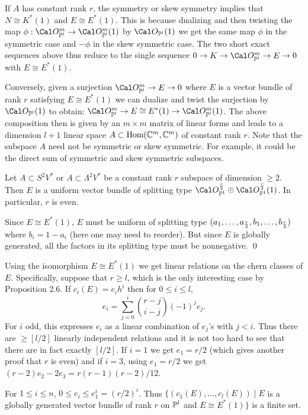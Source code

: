 If $A$ has constant rank $r$, the symmetry or skew symmetry
 implies that $N \cong K^*(1)$ and
$E \cong E^*(1)$. This is because dualizing and then twisting the
map $\phi: \co_{\pp{l}}^m \to \co_{\pp{l}}^m (1)$ by $\co_{\pp{l}}(1)$
we get the same map $\phi$ in the symmetric case and $-\phi$ in the skew
symmetric case. The two short exact sequences above thus reduce to the
single sequence $0 \to K \to \co_{\pp{l}}^m \to E \to 0$
with $E \cong E^*(1)$.

Conversely, given a surjection $\co_{\pp{l}}^m \to E \to 0$ where $E$ is
a vector bundle of rank $r$ satisfying $E \cong E^*(1)$ we can dualize and
twist the surjection by  $\co_{\pp{l}}(1)$ to obtain:
$\co_{\pp{l}}^m \to E \cong  E^*(1) \to \co_{\pp{l}}^m(1)$. The above 
composition then is given by an $m \times m$ matrix of linear forms  and leads
to a dimension $l+1$ linear space $A \subset \text{Hom}(\Bbb C^{m}, \Bbb C^{m})$ of
constant rank $r$. Note that the subspace $A$ need not be symmetric or
skew symmetric. For example, it could be the direct sum of symmetric and
skew symmetric subspaces.

 Let $A \subset S^2 V^*$ or $A \subset \Lambda^2V^*$ be a constant
rank $r$ subspace of dimension $\ge 2$. 
 Then $E$ is a uniform vector bundle of splitting type
$\co_{\pp 1}^{\frac r2}\oplus \Cal O^{\frac r2}_{\pp 1}(1)$. In particular,
$r$ is even.
\endproclaim

Since $E \cong E^*(1)$, $E$ must be uniform of splitting type
$(a_1, \hdots , a_{\frac r2},b_1, \hdots , b_{\frac r 2})$ where $b_i=1-a_i$ (here one
may need to reorder). But since $E$ is globally generated,
all the factors in its splitting type must be nonnegative.
\qed\enddemo

Using the isomorphism $E \cong E^*(1)$ we get linear relations on the
chern classes of $E$. Specifically, suppose that $r \ge l$, which is the
only interesting case by Proposition 2.6. If $c_i(E) = e_i h^i$ 
then for $0 \le i \le l$, 
$$e_i = \sum_{j=0}^{i} \binom{r-j}{i-j}(-1)^j e_j.$$
For $i$ odd, this 
expresses $e_i$ as a linear combination of $e_j$'s with $j < i$. Thus
there are $\ge [l/2]$ linearly independent relations and it is not
too hard to see that there are in fact exactly $[l/2]$. 
If $i = 1$ we get $e_1 = r/2$ (which gives another proof that
$r$ is even) and if $i=3$, using $e_1=r/2$ we get
$(r-2)e_2 - 2e_3 = r(r-1)(r-2)/12$.

 For $1 \le i \le n$, $0 \le e_i \le e_1^i = (r/2) ^i$.
Thus $\{ (c_1(E), \dots, c_l(E)) \mid E$  is a globally generated 
vector bundle of rank $r$ on $\Bbb P^{l}$ and $E \cong E^*(1) \}$
is a finite set. 
\endproclaim

